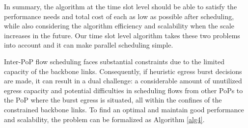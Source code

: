 
{In summary, the algorithm at the time slot level should be able to satisfy the performance needs and total cost of each {\egress} as low as possible after scheduling, while also considering the algorithm efficiency and scalability when the scale increases in the future. Our time slot level algorithm takes these two problems into account and it can make parallel scheduling simple.}


{ Inter-PoP flow scheduling faces substantial constraints due to the limited capacity of the backbone links. Consequently, if heuristic egress burst decisions are made, it can result in a dual challenge: a considerable amount of unutilized egress capacity and potential difficulties in scheduling flows from other PoPs to the PoP where the burst egress is situated, all within the confines of the constrained backbone links. To find an optimal and maintain good performance and scalability, the problem can be formalized as Algorithm \ref{alg4}}.

